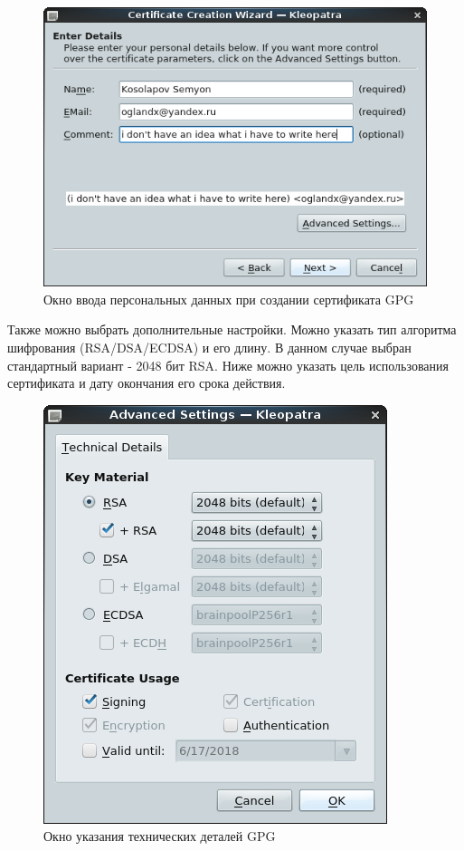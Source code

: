 \documentclass[a4paper]{article}
\begin{document}
\begin{figure}[H]
	\begin{center}
		\includegraphics[scale=0.5]{pics/Screenshot at 2016-04-18 00:40:50.png}
		\caption{Окно ввода персональных данных при создании сертификата GPG} 
		\label{pic:pic_name} %
	\end{center}
\end{figure}

Также можно выбрать дополнительные настройки. Можно указать тип алгоритма шифрования (RSA/DSA/ECDSA) и его длину. В данном случае выбран стандартный вариант - 2048 бит RSA. Ниже можно указать цель использования сертификата и дату окончания его срока действия.

\begin{figure}[H]
	\begin{center}
		\includegraphics[scale=0.5]{pics/Screenshot at 2016-06-17 13:41:46.png}
		\caption{Окно указания технических деталей GPG} 
		\label{pic:pic_name} %
	\end{center}
\end{figure}
\end{document}
